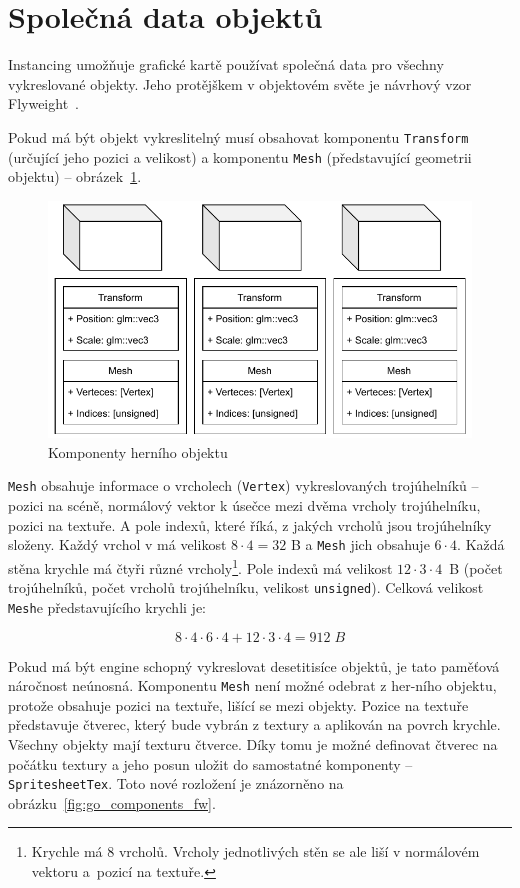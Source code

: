 \documentclass[thesis=M,czech]{FITthesis}[2019/12/23]
\begin{document}
\section{Společná data objektů}

Instancing umožňuje grafické kartě používat společná data pro všechny vykreslované objekty. Jeho protějškem v objektovém světe je návrhový vzor Flyweight~\cite{gpp_fly}.

Pokud má být objekt vykreslitelný musí obsahovat komponentu \texttt{Transform} (určující jeho pozici a velikost) a komponentu \texttt{Mesh} (představující geometrii objektu) -- obrázek~\ref{fig:go_components}.

\begin{figure}\centering
	\includegraphics[width=\textwidth]{images/go_components}
	\caption[Komponenty herního objektu]{Komponenty herního objektu}\label{fig:go_components}
\end{figure}

\texttt{Mesh} obsahuje informace o vrcholech (\texttt{Vertex}) vykreslovaných trojúhelníků -- pozici na scéně, normálový vektor k úsečce mezi dvěma vrcholy trojúhelníku, pozici na textuře. A pole indexů, které říká, z jakých vrcholů jsou trojúhelníky složeny. Každý vrchol v má velikost $8 \cdot 4 = 32$ B a \texttt{Mesh} jich obsahuje $6 \cdot 4$. Každá stěna krychle má čtyři různé vrcholy\footnote{Krychle má 8 vrcholů. Vrcholy jednotlivých stěn se ale liší v normálovém vektoru a~pozicí na textuře.}. Pole indexů má velikost $12 \cdot 3 \cdot 4$~B (počet trojúhelníků, počet vrcholů trojúhelníku, velikost \texttt{unsigned}). Celková velikost \texttt{Mesh}e představujícího krychli je:

\[8 \cdot 4 \cdot 6 \cdot 4 + 12 \cdot 3 \cdot 4 = 912\; B\]

Pokud má být engine schopný vykreslovat desetitisíce objektů, je tato paměťová náročnost neúnosná. Komponentu \texttt{Mesh} není možné odebrat z her-ního objektu, protože obsahuje pozici na textuře, lišící se mezi objekty. Pozice na textuře představuje čtverec, který bude vybrán z textury a aplikován na povrch krychle. Všechny objekty mají texturu čtverce. Díky tomu je možné definovat čtverec na počátku textury a jeho posun uložit do samostatné komponenty -- \texttt{SpritesheetTex}. Toto nové rozložení je znázorněno na obrázku~\ref{fig:go_components_fw}.
\end{document}

